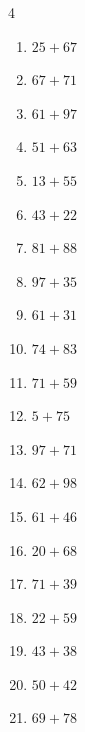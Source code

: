 \begin{multicols}{4}
\begin{enumerate}
\columnbreak %

  \item $25+67$
        \phantom{$=92$}

  \item $67+71$
        \phantom{$=138$}

  \item $61+97$
        \phantom{$=158$}

  \item $51+63$
        \phantom{$=114$}

  \item $13+55$
        \phantom{$=68$}

  \item $43+22$
        \phantom{$=65$}

  \item $81+88$
        \phantom{$=169$}

  \item $97+35$
        \phantom{$=132$}

  \item $61+31$
        \phantom{$=92$}

  \item $74+83$
        \phantom{$=157$}

  \item $71+59$
        \phantom{$=130$}

  \item $5+75$
        \phantom{$=80$}

  \item $97+71$
        \phantom{$=168$}

  \item $62+98$
        \phantom{$=160$}

  \item $61+46$
        \phantom{$=107$}

  \item $20+68$
        \phantom{$=88$}

  \item $71+39$
        \phantom{$=110$}

  \item $22+59$
        \phantom{$=81$}

  \item $43+38$
        \phantom{$=81$}

  \item $50+42$
        \phantom{$=92$}

  \item $69+78$
        \phantom{$=147$}


\end{enumerate}
\end{multicols}
